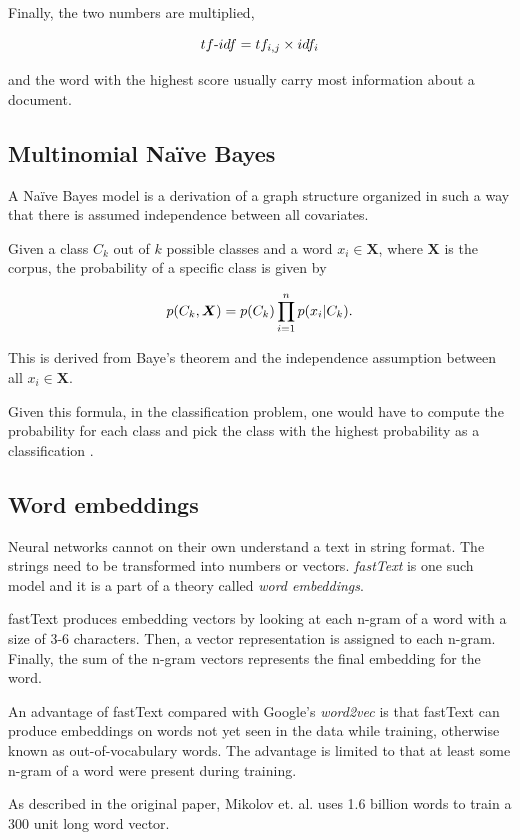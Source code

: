 \documentclass[conference]{IEEEtran}
\begin{document}
Finally, the two numbers are multiplied,

$$ tf\textnormal{-}idf = tf_{i,j} \times idf_i$$ 

\noindent and the word with the highest score usually carry most information about a document. \cite{tfidf}

\subsection{Multinomial Naïve Bayes}
A Naïve Bayes model is a derivation of a graph structure organized in such a way that there is assumed independence between all covariates.

Given a class $C_k$ out of $k$ possible classes and a word $x_i \in \boldsymbol{X}$, where $\boldsymbol{X}$ is the corpus, the probability of a specific class is given by


$$p(C_k, \boldsymbol{X}) = p(C_k) \prod_{i=1}^n p(x_i | C_k) \textnormal{.}$$

\noindent This is derived from Baye's theorem and the independence assumption between all $x_i \in \boldsymbol{X}$. \cite{ai-book}

Given this formula, in the classification problem, one would have to compute the probability for each class and pick the class with the highest probability as a classification \cite{itir}.

\subsection{Word embeddings}
Neural networks cannot on their own understand a text in string format. The strings need to be transformed into numbers or vectors. \textit{fastText} is one such model and it is a part of a theory called \textit{word embeddings}. 

fastText produces embedding vectors by looking at each n-gram of a word with a size of 3-6 characters. Then, a vector representation is assigned to each n-gram. Finally, the sum of the n-gram vectors represents the final embedding for the word. \cite{fasttext}

An advantage of fastText compared with Google's \textit{word2vec} \cite{word2vec} is that fastText can produce embeddings on words not yet seen in the data while training, otherwise known as out-of-vocabulary words. The advantage is limited to that at least some n-gram of a word were present during training. \cite{fasttext}

As described in the original paper, Mikolov et. al. \cite{word2vec} uses 1.6 billion words to train a 300 unit long word vector.
\end{document}
